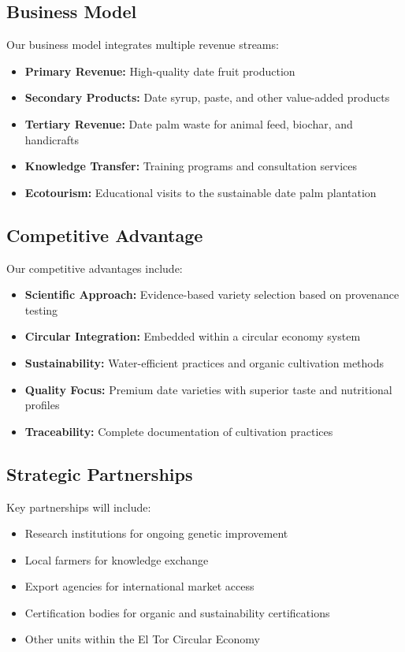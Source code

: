 \subsection{Business Model}
Our business model integrates multiple revenue streams:

\begin{itemize}
    \item \textbf{Primary Revenue:} High-quality date fruit production
    \item \textbf{Secondary Products:} Date syrup, paste, and other value-added products
    \item \textbf{Tertiary Revenue:} Date palm waste for animal feed, biochar, and handicrafts
    \item \textbf{Knowledge Transfer:} Training programs and consultation services
    \item \textbf{Ecotourism:} Educational visits to the sustainable date palm plantation
\end{itemize}

\subsection{Competitive Advantage}
Our competitive advantages include:

\begin{itemize}
    \item \textbf{Scientific Approach:} Evidence-based variety selection based on provenance testing
    \item \textbf{Circular Integration:} Embedded within a circular economy system
    \item \textbf{Sustainability:} Water-efficient practices and organic cultivation methods
    \item \textbf{Quality Focus:} Premium date varieties with superior taste and nutritional profiles
    \item \textbf{Traceability:} Complete documentation of cultivation practices
\end{itemize}

\subsection{Strategic Partnerships}
Key partnerships will include:

\begin{itemize}
    \item Research institutions for ongoing genetic improvement
    \item Local farmers for knowledge exchange
    \item Export agencies for international market access
    \item Certification bodies for organic and sustainability certifications
    \item Other units within the El Tor Circular Economy
\end{itemize}

